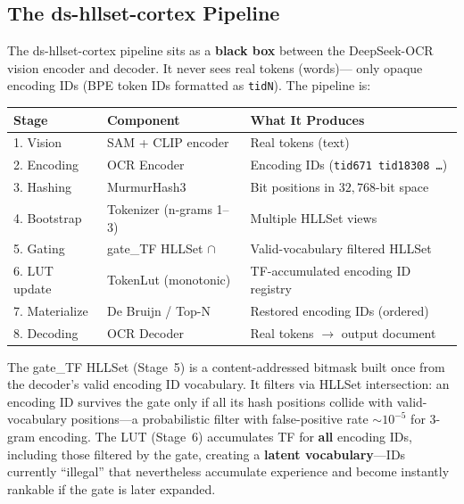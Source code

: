 \documentclass[11pt,a4paper]{article}
\theoremstyle{remark}
\begin{document}
\subsection{The ds-hllset-cortex Pipeline}
\label{sec:cortex-pipeline}

The ds-hllset-cortex pipeline sits as a \textbf{black box} between the
DeepSeek-OCR vision encoder and decoder. It never sees real tokens (words)---
only opaque encoding IDs (BPE token IDs formatted as \texttt{tidN}). The
pipeline is:

\begin{center}
\begin{tabular}{@{}lll@{}}
\toprule
\textbf{Stage} & \textbf{Component} & \textbf{What It Produces} \\
\midrule
1. Vision     & SAM + CLIP encoder   & Real tokens (text) \\
2. Encoding   & OCR Encoder          & Encoding IDs (\texttt{tid671 tid18308 \ldots}) \\
3. Hashing    & MurmurHash3          & Bit positions in $32{,}768$-bit space \\
4. Bootstrap  & Tokenizer (n-grams 1--3) & Multiple HLLSet views \\
5. Gating     & gate\_TF HLLSet $\cap$ & Valid-vocabulary filtered HLLSet \\
6. LUT update & TokenLut (monotonic) & TF-accumulated encoding ID registry \\
7. Materialize& De Bruijn / Top-N    & Restored encoding IDs (ordered) \\
8. Decoding   & OCR Decoder          & Real tokens $\to$ output document \\
\bottomrule
\end{tabular}
\end{center}

The gate\_TF HLLSet (Stage~5) is a content-addressed bitmask built once from
the decoder's valid encoding ID vocabulary. It filters via HLLSet intersection:
an encoding ID survives the gate only if all its hash positions collide with
valid-vocabulary positions---a probabilistic filter with false-positive rate
$\sim$$10^{-5}$ for 3-gram encoding. The LUT (Stage~6) accumulates TF for
\textbf{all} encoding IDs, including those filtered by the gate, creating a
\textbf{latent vocabulary}---IDs currently ``illegal'' that nevertheless
accumulate experience and become instantly rankable if the gate is later
expanded.
\end{document}

